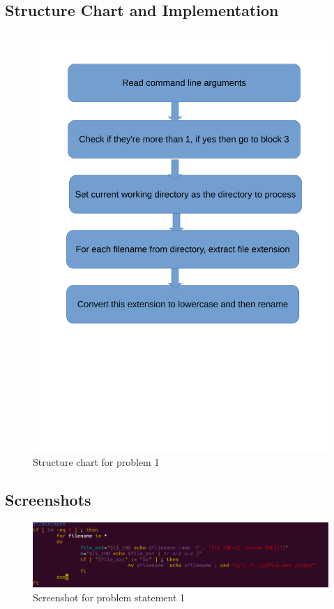 \documentclass[11pt]{report}
\begin{document}
	\subsection{Structure Chart and Implementation}
	\begin{figure}[h!]
	\centering
	\includegraphics[scale=0.7]{images/shots11}
	\caption{Structure chart for problem 1}
	\end{figure}		
	\pagebreak
	\subsection{Screenshots}
	\begin{figure}[h!]
	\centering
	\includegraphics[scale=0.8, center]{images/screenshot1}
	\caption{Screenshot for problem statement 1}
	\end{figure}
	\pagebreak
\end{document}
